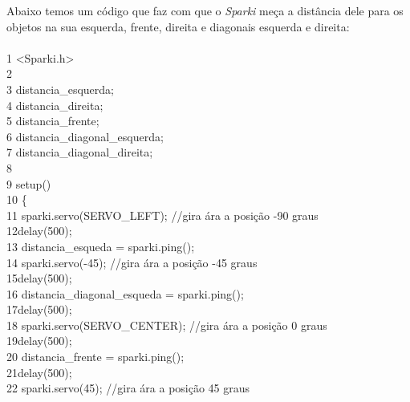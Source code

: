 \documentclass[conference]{IEEEtran}
\begin{document}
    \par
    Abaixo temos um código que faz com que o \textit{Sparki} meça a distância dele para os objetos na sua esquerda, frente, direita e diagonais esquerda e direita:
    \\
    \\
    {\selectfont 
    {\color{cinza}1} <Sparki.h>\\
    {\color{cinza}2}\quad\\
    {\color{cinza}3} distancia\_esquerda;\\
    {\color{cinza}4}  distancia\_direita;\\
    {\color{cinza}5} distancia\_frente;\\
    {\color{cinza}6} distancia\_diagonal\_esquerda;\\
    {\color{cinza}7} distancia\_diagonal\_direita;\\
    {\color{cinza}8}\quad\\
    {\color{cinza}9} setup()\\
    {\color{cinza}10} \{\\
    {\color{cinza}11}\quad\quad
    sparki.servo(SERVO\_LEFT); 
    {\color{cinza}//gira ára a posição -90 graus}\\
    {\color{cinza}12}\quad\quad delay(500);\\
    {\color{cinza}13}\quad\quad
    distancia\_esqueda = sparki.ping();\\
    {\color{cinza}14}\quad\quad
    sparki.servo(-45); 
    {\color{cinza}//gira ára a posição -45 graus}\\
    {\color{cinza}15}\quad\quad delay(500);\\
    {\color{cinza}16}\quad\quad
    distancia\_diagonal\_esqueda = sparki.ping();\\
    {\color{cinza}17}\quad\quad delay(500);\\
    {\color{cinza}18}\quad\quad
    sparki.servo(SERVO\_CENTER); 
    {\color{cinza}//gira ára a posição 0 graus}\\
    {\color{cinza}19}\quad\quad delay(500);\\
    {\color{cinza}20}\quad\quad
    distancia\_frente = sparki.ping();\\
    {\color{cinza}21}\quad\quad delay(500);\\
    {\color{cinza}22}\quad\quad
    sparki.servo(45); 
    {\color{cinza}//gira ára a posição 45 graus}\\
}
\end{document}
